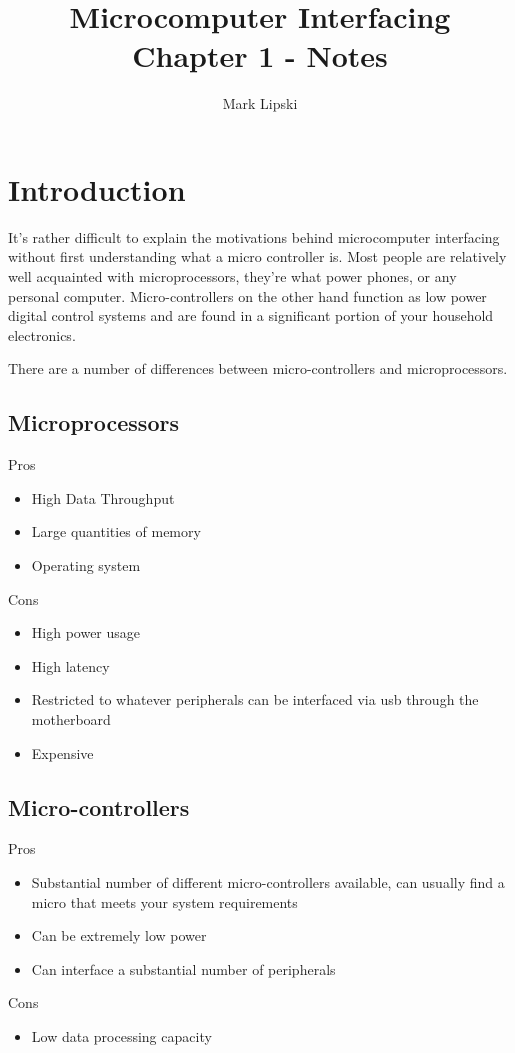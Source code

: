 \documentclass[10pt]{article}
\title{Microcomputer Interfacing Chapter 1 - Notes}
\author{Mark Lipski}
\begin{document}
\maketitle
\section{Introduction}
It's rather difficult to explain the motivations behind microcomputer interfacing without first understanding what a micro controller is. Most people are relatively well acquainted with microprocessors, they're what power phones, or any personal computer. Micro-controllers on the other hand function as low power digital control systems and are found in a significant portion of your household electronics.

There are a number of differences between micro-controllers and microprocessors.
\subsection{Microprocessors}
Pros
\begin{itemize}
\item High Data Throughput
\item Large quantities of memory
\item Operating system
\end{itemize}
Cons
\begin{itemize}
\item High power usage
\item High latency
\item Restricted to whatever peripherals can be interfaced via usb through the motherboard
\item Expensive
\end{itemize}
	
\subsection{Micro-controllers}
Pros
\begin{itemize}
\item Substantial number of different micro-controllers available, can usually find a micro that meets your system requirements
\item Can be extremely low power
\item Can interface a substantial number of peripherals
\end{itemize}

Cons
\begin{itemize}
\item Low data processing capacity
\end{itemize}
\end{document}
